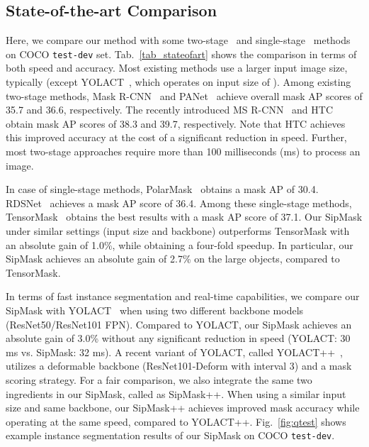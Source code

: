 \documentclass[runningheads]{llncs}
\begin{document}
\subsection{State-of-the-art Comparison}
Here, we compare our method with some two-stage~\cite{Dai_MNC_CVPR_2016,Li_FCIS_CVPR_2017,Fu_retinamask_arXiv_2019,Chen_MaskLab_CVPR_2018,He_MaskRCNN_ICCV_2017,Liu_PANet_CVPR_2018,Huang_MSRCNN_CVPR_2019,Chen_HTC_CVPR_2019,Cao_D2Det_CVPR_2020} and single-stage~\cite{Zhou_ExtremeNet_CVPR_2019,Bolya_YOLACT_ICCV_2019,Xie_PolarMask_arXiv_2019,Chen_TensorMask_ICCV_2019} methods on COCO \texttt{test-dev} set. Tab.~\ref{tab_stateofart} shows the comparison in terms of both speed and accuracy. Most existing methods use a larger input image size, typically  (except YOLACT~\cite{Bolya_YOLACT_ICCV_2019}, which operates on input size of ). Among existing two-stage methods, Mask R-CNN~\cite{He_MaskRCNN_ICCV_2017} and PANet~\cite{Liu_PANet_CVPR_2018} achieve overall mask AP scores of 35.7 and 36.6, respectively. The  recently introduced MS R-CNN~\cite{He_MaskRCNN_ICCV_2017} and HTC~\cite{Chen_HTC_CVPR_2019}  obtain mask AP scores of 38.3 and 39.7, respectively. Note that HTC achieves this improved accuracy at the cost of a significant reduction in speed. Further, most two-stage approaches require more than 100 milliseconds (ms) to process an image. 

In case of single-stage methods, PolarMask~\cite{Xie_PolarMask_arXiv_2019} obtains a mask AP of 30.4. RDSNet~\cite{Wang_RDSNet_AAAI_2020} achieves a mask AP score of 36.4. Among these single-stage methods, TensorMask~\cite{Chen_TensorMask_ICCV_2019} obtains the best results with a mask AP score of 37.1. Our SipMask under similar settings (input size and backbone) outperforms TensorMask with an absolute gain of 1.0\%, while obtaining a four-fold speedup. In particular, our SipMask achieves an absolute gain of 2.7\% on the large objects, compared to TensorMask. 

In terms of fast instance segmentation and real-time capabilities, we compare our SipMask with YOLACT~\cite{Bolya_YOLACT_ICCV_2019} when using two different backbone models (ResNet50/ResNet101 FPN). Compared to YOLACT, our SipMask achieves an absolute gain of 3.0\% without any significant reduction in speed (YOLACT: 30 ms vs. SipMask: 32 ms). 
A recent variant of YOLACT, called YOLACT++~\cite{Bolya_YOLACT++_arXiv_2020}, utilizes a deformable backbone (ResNet101-Deform \cite{Zhu_DCNV2_CVPR_2019} with interval 3) and a mask scoring strategy. For a fair comparison, we also integrate the same two ingredients in our SipMask, called as SipMask++. When using a similar input size and same backbone, our SipMask++ achieves improved mask accuracy while operating at the same speed, compared to YOLACT++. Fig.~\ref{fig:qtest} shows example instance segmentation  results of our SipMask on COCO \texttt{test-dev}. 
\end{document}
